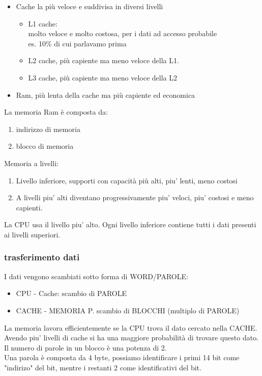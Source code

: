 \documentclass[arch.tex]{subfiles}
\begin{document}
\begin{itemize}
	\item Cache la più veloce e suddivisa in diversi livelli
		\begin{itemize}
			\item L1 cache:\\
				molto veloce e molto costosa, per i dati ad accesso probabile\\
				es. 10\% di cui parlavamo prima
			\item L2 cache, più capiente ma meno veloce della L1.
			\item L3 cache, più capiente ma meno veloce della L2
		\end{itemize}
	\item Ram, più lenta della cache ma più capiente ed economica
\end{itemize}
La memoria Ram è composta da:
\begin{enumerate}
	\item indirizzo di memoria
	\item blocco di memoria 
\end{enumerate}
Memoria a livelli:
\begin{enumerate}
	\item Livello inferiore, supporti con capacità più alti, piu' lenti, meno costosi
	\item A livelli piu' alti diventano progressivamente piu' veloci, piu' costosi
		e meno capienti.
\end{enumerate}
La CPU usa il livello piu' alto. Ogni livello inferiore contiene tutti i dati presenti ai 
livelli superiori.

\subsubsection{trasferimento dati}
I dati vengono scambiati sotto forma di WORD/PAROLE:

\begin{itemize}
	\item CPU - Cache: scambio di PAROLE
	\item CACHE - MEMORIA P. scambio di BLOCCHI (multiplo di PAROLE)
\end{itemize}
La memoria lavora efficientemente se la CPU trova il dato cercato nella CACHE. Avendo 
piu' livelli di cache si ha una maggiore probabilità di trovare questo dato.\\
Il numero di parole in un blocco è una potenza di 2. \\
Una parola è composta da 4 byte, possiamo identificare i primi 14 bit come 
"indirizo" del bit, mentre i restanti 2 come identificativi del bit.
\end{document}
